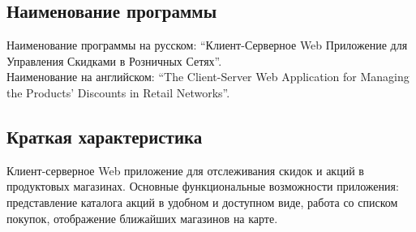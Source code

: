 \subsection{Наименование программы}
Наименование программы на русском: 
``Клиент-Серверное Web Приложение для Управления Скидками в Розничных Сетях''. \\
Наименование на английском: 
``The Client-Server Web Application for Managing the Products' Discounts in Retail Networks''. \\


\subsection{Краткая характеристика}
Клиент-серверное Web приложение для отслеживания скидок и акций в продуктовых магазинах.
Основные функциональные возможности приложения: представление каталога акций в удобном и доступном
виде, работа со списком покупок, отображение ближайших магазинов на карте.
